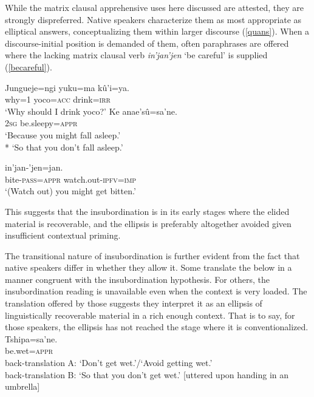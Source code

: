 \documentclass[output=paper,colorlinks,citecolor=brown]{langscibook}
\begin{document}
While the matrix clausal apprehensive uses here discussed are attested, they are strongly dispreferred. Native speakers characterize them as most appropriate as elliptical answers, conceptualizing them within larger discourse (\ref{quans}). When a dis\-course-initial position is demanded of them, often paraphrases are offered where the lacking matrix clausal verb \emph{in'jan'jen} `be careful' is supplied (\ref{becareful}).
\begin{exe} 
    \ex \label{quans} \begin{xlist}
     \gll Jungueje=ngi yuku=ma kû'i=ya. \\
             why\textsc{=}1     yoco=\textsc{acc} drink=\textsc{irr} \\
        \glt `Why should I drink yoco?'
     \gll {\ob}Ke anae'sû=sa'ne.{\cb} \\
            \textsc{2sg} {be.sleepy=\textsc{appr}} \\
        \glt `Because you might fall asleep.' \\*
             `So that you don't fall asleep.'
    \end{xlist}
    \ex \label{becareful}
     in'jan-'jen=jan. \\
         bite-\textsc{pass=appr} {watch.out-\textsc{ipfv=imp}} \\
    \glt `(Watch out) you might get bitten.'
\end{exe}

This suggests that the insubordination is in its early stages where the elided material is recoverable, and the ellipsis is preferably altogether avoided given insufficient contextual priming. 

The transitional nature of  insubordination is further evident from the fact that native speakers differ in whether they allow it. Some translate the below in a manner congruent with the insubordination hypothesis. For others, the insubordination reading is unavailable even when the context is very loaded. The translation offered by those suggests they interpret it as an ellipsis of linguistically recoverable material in a rich enough context. That is to say, for those speakers, the ellipsis has not reached the stage where it is conventionalized. 
    \ea \label{tshipasane}
    \gll {\ob}Tshipa=sa'ne.{\cb} \\
         {be.wet}=\textsc{appr} \\
    \glt back-translation A: `Don't get wet.'/`Avoid getting wet.'\\
         back-translation B: `So that you don't get wet.' [uttered upon handing in an umbrella]
    \z
    
\end{document}

